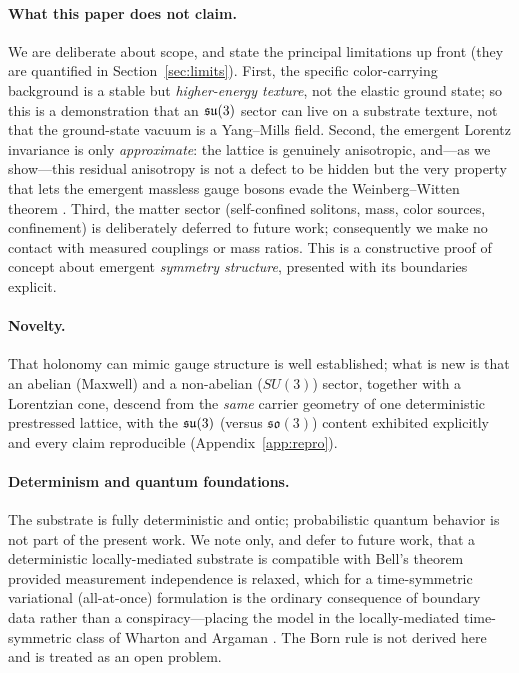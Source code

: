 \paragraph{What this paper does not claim.} We are deliberate about scope, and state the
principal limitations up front (they are quantified in Section~\ref{sec:limits}). First,
the specific color-carrying background is a stable but \emph{higher-energy texture}, not
the elastic ground state; so this is a demonstration that an $\mathfrak{su}(3)$ sector can live on
a substrate texture, not that the ground-state vacuum is a Yang--Mills field. Second, the
emergent Lorentz invariance is only \emph{approximate}: the lattice is genuinely
anisotropic, and---as we show---this residual anisotropy is not a defect to be hidden but
the very property that lets the emergent massless gauge bosons evade the Weinberg--Witten
theorem \citep{WeinbergWitten1980}. Third, the matter sector (self-confined solitons,
mass, color sources, confinement) is deliberately deferred to future work; consequently
we make no contact with measured couplings or mass ratios. This is a constructive proof
of concept about emergent \emph{symmetry structure}, presented with its boundaries
explicit.

\paragraph{Novelty.} That holonomy can mimic gauge structure is well established; what is
new is that an abelian (Maxwell) and a non-abelian ($SU(3)$) sector, together with a
Lorentzian cone, descend from the \emph{same} carrier geometry of one deterministic
prestressed lattice, with the $\mathfrak{su}(3)$ (versus $\mathfrak{so}(3)$) content exhibited
explicitly and every claim reproducible (Appendix~\ref{app:repro}).

\paragraph{Determinism and quantum foundations.} The substrate is fully deterministic
and ontic; probabilistic quantum behavior is not part of the present work. We note only,
and defer to future work, that a deterministic locally-mediated substrate is compatible
with Bell's theorem \citep{Bell1964} provided measurement independence is relaxed, which
for a time-symmetric variational (all-at-once) formulation is the ordinary consequence of
boundary data rather than a conspiracy---placing the model in the locally-mediated
time-symmetric class of Wharton and Argaman \citep{WhartonArgaman2020}. The Born rule is
not derived here and is treated as an open problem.
